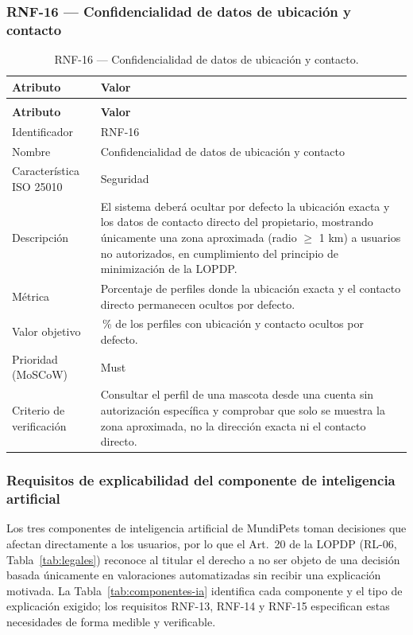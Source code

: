 \documentclass[journal,onecolumn]{IEEEtran}
\makeatletter
\newenvironment{atributos}[2]{%
	\small
	\begin{longtable}{@{}>{\raggedright\arraybackslash}p{4.2cm} >{\raggedright\arraybackslash}p{11.2cm}@{}}
		\caption{#2}\label{tab:#1}\\
		\toprule
		\textbf{Atributo} & \textbf{Valor} \\
		\midrule
		\endfirsthead
		\multicolumn{2}{@{}l}{\small\itshape (continuación)}\\
		\toprule
		\textbf{Atributo} & \textbf{Valor} \\
		\midrule
		\endhead
		\bottomrule
		\endlastfoot
	}{%
	\end{longtable}
	\normalsize
}
\makeatother
\begin{document}
	\subsubsection{RNF-16 --- Confidencialidad de datos de ubicación y contacto}
	
	\begin{atributos}{RNF-16}{RNF-16 --- Confidencialidad de datos de ubicación y contacto.}
		Identificador & RNF-16 \\
		Nombre & Confidencialidad de datos de ubicación y contacto \\
		Característica ISO 25010 & Seguridad \\
		Descripción & El sistema deberá ocultar por defecto la ubicación exacta y los datos de contacto directo del propietario, mostrando únicamente una zona aproximada (radio $\geq$ 1 km) a usuarios no autorizados, en cumplimiento del principio de minimización de la LOPDP. \\
		Métrica & Porcentaje de perfiles donde la ubicación exacta y el contacto directo permanecen ocultos por defecto. \\
		Valor objetivo & 100\,\% de los perfiles con ubicación y contacto ocultos por defecto. \\
		Prioridad (MoSCoW) & Must \\
		Criterio de verificación & Consultar el perfil de una mascota desde una cuenta sin autorización específica y comprobar que solo se muestra la zona aproximada, no la dirección exacta ni el contacto directo. \\
	\end{atributos}
	
	\subsubsection{Requisitos de explicabilidad del componente de inteligencia artificial}
	\label{sec:explicabilidad}
	
	Los tres componentes de inteligencia artificial de MundiPets toman decisiones
	que afectan directamente a los usuarios, por lo que el Art.~20 de la LOPDP
	(RL-06, Tabla~\ref{tab:legales}) reconoce al titular el derecho a no ser objeto
	de una decisión basada únicamente en valoraciones automatizadas sin recibir una
	explicación motivada. La Tabla~\ref{tab:componentes-ia} identifica cada
	componente y el tipo de explicación exigido; los requisitos RNF-13, RNF-14 y
	RNF-15 especifican estas necesidades de forma medible y verificable.
	
\end{document}
